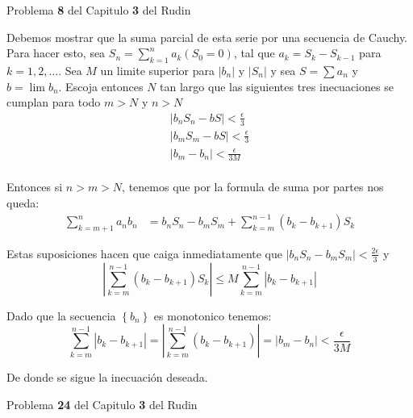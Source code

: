 \documentclass[12pt]{article}
\newenvironment{ex}[2][Ejercicio]{\begin{trivlist}
\item[\hskip \labelsep {\bfseries #1}\hskip \labelsep {\bfseries #2.}]}{\end{trivlist}}
\newenvironment{sol}[1][Solución]{\begin{trivlist}
\item[\hskip \labelsep {\bfseries #1:}]}{\end{trivlist}}
\begin{document}
\begin{ex}{2}
  Problema \textbf{8} del Capitulo \textbf{3} del Rudin
\end{ex}
\begin{sol}
  Debemos mostrar que la suma parcial de esta serie por una secuencia de Cauchy. Para hacer esto, sea $S_n = \displaystyle\sum_{k=1}^{n} a_k (S_0 = 0)$, tal que $a_k = S_k - S_{k-1}$ para $k=1,2,\dots$. Sea $M$ un limite superior para $\left|b_n\right|$ y $\left|S_n\right|$ y sea $S = \displaystyle\sum a_n$ y $b = \displaystyle\lim b_n$. Escoja entonces $N$ tan largo que las siguientes tres inecuaciones se cumplan para todo $m > N$ y $n > N$
  \begin{align*}
    \left|b_nS_n - bS\right| < \displaystyle\frac{\epsilon}{3}\\
    \left|b_mS_m - bS\right| < \displaystyle\frac{\epsilon}{3}\\
    \left|b_m - b_n\right| < \displaystyle\frac{\epsilon}{3M}\\
  \end{align*}

  Entonces si $n > m > N$, tenemos que por la formula de suma por partes nos queda:
  \begin{align*}
    \displaystyle\sum_{k = m + 1}^{n} a_nb_n &= b_nS_n - b_mS_m + \displaystyle\sum_{k=m}^{n -1}(b_k - b_{k+1})S_k
  \end{align*}

  Estas suposiciones hacen que caiga inmediatamente que $\left|b_nS_n - b_mS_m\right| < \displaystyle\frac{2\epsilon}{3}$ y \[
    \left|\displaystyle\sum_{k=m}^{n - 1}\left(b_k - b_{k + 1}\right)S_k\right| \le M \displaystyle\sum_{k = m}^{n - 1} \left| b_k - b_{k + 1}\right|
  \]

  Dado que la secuencia $\left\{b_n\right\}$ es monotonico tenemos:\[
    \displaystyle\sum_{k=m}^{n - 1}|b_k - b_{k + 1}| = \left|\displaystyle\sum_{k = m}^{n - 1}(b_k - b_{k +1})\right| = \left|b_m - b_n\right| < \frac{\epsilon}{3M}
  \]

  De donde se sigue la inecuación deseada.
\end{sol}

\begin{ex}{3}
  Problema \textbf{24} del Capitulo \textbf{3} del Rudin
\end{ex}
\end{document}
